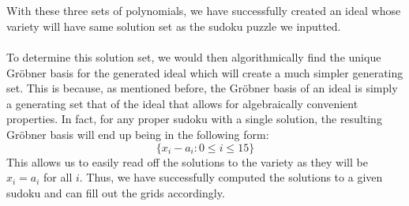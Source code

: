 \documentclass[11pt]{article}
\begin{document}
\\ \\ With these three sets of polynomials, we have successfully created an ideal whose variety will have same solution set as the sudoku puzzle we inputted.
\\ \\ To determine this solution set, we would then algorithmically find the unique Gröbner basis for the generated ideal which will create a much simpler generating set. This is because, as mentioned before, the Gröbner basis of an ideal is simply a generating set that of the ideal that allows for algebraically convenient properties. In fact, for any proper sudoku with a single solution, the resulting Gröbner basis will end up being in the following form:
\[\{x_i - a_i: 0 \leq i\leq 15\}\]
This allows us to easily read off the solutions to the variety as they will be $x_i = a_i$ for all $i$. Thus, we have successfully computed the solutions to a given sudoku and can fill out the grids accordingly.
\end{document}
